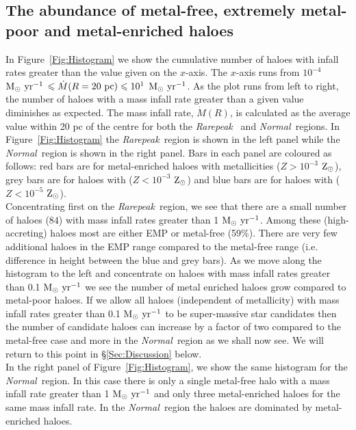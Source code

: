 \documentclass[graphics, twocolumn, usenatbib]{mn2e}
\newcommand{\msolaryr} {$\rm{M_{\odot}~yr^{-1}}~$}
\newcommand{\msolaryrc} {$\rm{M_{\odot}~yr^{-1}}$}
\newcommand{\zsolarc} {$\rm{Z_{\odot}}$}
\newcommand{\rarepeak} {\textit{Rarepeak~}}
\newcommand{\normal} {\textit{Normal~}}
\begin{document}
\subsection{The abundance of metal-free, extremely metal-poor and metal-enriched haloes}

In Figure~\ref{Fig:Histogram} we show the cumulative number of haloes with infall rates greater than
the value given on the $x$-axis. The $x$-axis runs from
$10^{-4}$ \msolaryr $\leq \dot{M}(R=20~{\rm pc}) \leq 10^{1}$ \msolaryrc. 
As the plot runs from left to right, the number of haloes with a
mass infall rate greater than a given value diminishes as expected. The mass infall rate,
$\dot{M}(R)$, is calculated as the average value within 20 pc of the centre for both the \rarepeak 
and \normal regions. In Figure~\ref{Fig:Histogram} the
\rarepeak region is shown in the left panel while the \normal region is shown in the right 
panel. Bars in each panel are coloured as follows: red bars are for metal-enriched haloes with
metallicities ($Z > 10^{-3}$ \zsolarc), grey bars are for haloes with ($Z < 10^{-3}$ \zsolarc) and
blue bars are for haloes with ($Z < 10^{-5}$ \zsolarc).\\
\indent Concentrating first on the \rarepeak region, we see that there are a small number of
haloes ($84$) with mass infall rates greater than 1 \msolaryrc. Among these (high-accreting)
haloes most are either EMP or metal-free (59\%). There are very few additional haloes in the
EMP range compared to the metal-free range (i.e. difference in height between the
blue and grey bars). As we move along the histogram to the
left and concentrate on haloes with mass infall rates greater than 0.1 \msolaryr we see the
number of metal enriched haloes grow compared to
metal-poor haloes. If we allow all haloes (independent of metallicity) with mass infall rates greater
than  0.1 \msolaryr to be super-massive star candidates then the number of candidate haloes can
increase by a factor of two compared to the metal-free case and more in the \normal region as we
shall now see. We will return to this point in \S \ref{Sec:Discussion} below. \\
\indent In the right panel of Figure~\ref{Fig:Histogram},
we show the same histogram for the \normal region. In this case there is only a single metal-free halo
with a mass infall rate greater than 1 \msolaryr and only three metal-enriched haloes for the
same mass infall rate. In the \normal region the haloes are dominated by metal-enriched haloes.
\end{document}
